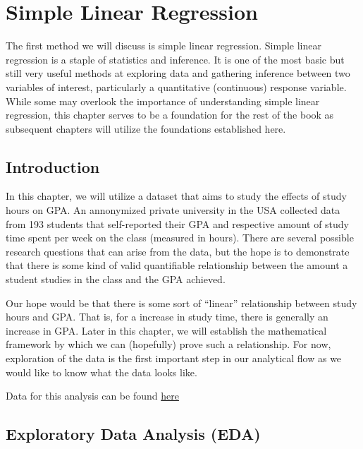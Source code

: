 \documentclass[
  letterpaper,
  DIV=11,
  numbers=noendperiod]{scrreprt}
\begin{document}
\hypertarget{simple-linear-regression}{%
\chapter{Simple Linear Regression}\label{simple-linear-regression}}

The first method we will discuss is simple linear regression. Simple
linear regression is a staple of statistics and inference. It is one of
the most basic but still very useful methods at exploring data and
gathering inference between two variables of interest, particularly a
quantitative (continuous) response variable. While some may overlook the
importance of understanding simple linear regression, this chapter
serves to be a foundation for the rest of the book as subsequent
chapters will utilize the foundations established here.

\hypertarget{introduction-1}{%
\section{Introduction}\label{introduction-1}}

In this chapter, we will utilize a dataset that aims to study the
effects of study hours on GPA. An annonymized private university in the
USA collected data from 193 students that self-reported their GPA and
respective amount of study time spent per week on the class (measured in
hours). There are several possible research questions that can arise
from the data, but the hope is to demonstrate that there is some kind of
valid quantifiable relationship between the amount a student studies in
the class and the GPA achieved.

Our hope would be that there is some sort of ``linear'' relationship
between study hours and GPA. That is, for a increase in study time,
there is generally an increase in GPA. Later in this chapter, we will
establish the mathematical framework by which we can (hopefully) prove
such a relationship. For now, exploration of the data is the first
important step in our analytical flow as we would like to know what the
data looks like.

Data for this analysis can be found
\href{https://www.kaggle.com/datasets/joebeachcapital/gpa-study-hours}{here}

\hypertarget{exploratory-data-analysis-eda}{%
\section{Exploratory Data Analysis
(EDA)}\label{exploratory-data-analysis-eda}}
\end{document}
